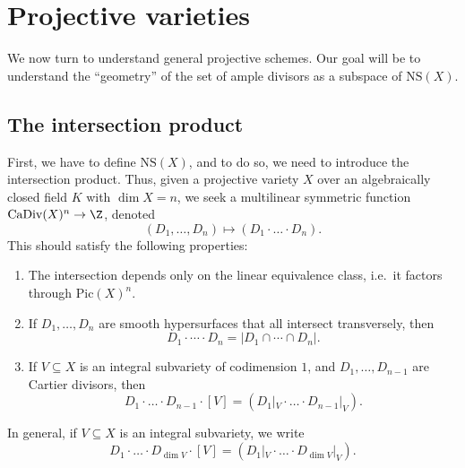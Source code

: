 \documentclass[a4paper]{article}
\newcommand\CaDiv{\mathrm{CaDiv}}
\newcommand\Pic{\mathrm{Pic}}
\newcommand\NS{\mathrm{NS}}
\begin{document}
\section{Projective varieties}
We now turn to understand general projective schemes. Our goal will be to understand the ``geometry'' of the set of ample divisors as a subspace of $\NS(X)$.

\subsection{The intersection product}
First, we have to define $\NS(X)$, and to do so, we need to introduce the intersection product. Thus, given a projective variety $X$ over an algebraically closed field $K$ with $\dim X = n$, we seek a multilinear symmetric function $\CaDiv(X)^n \to \Z$, denoted
\[
  (D_1, \ldots, D_n) \mapsto (D_1 \cdot \ldots \cdot D_n).
\]
This should satisfy the following properties:
\begin{enumerate}
  \item The intersection depends only on the linear equivalence class, i.e.\ it factors through $\Pic(X)^n$.
  \item If $D_1, \ldots, D_n$ are smooth hypersurfaces that all intersect transversely, then
    \[
      D_1 \cdot \cdots \cdot D_n = |D_1 \cap \cdots \cap D_n|.
    \]
  \item If $V \subseteq X$ is an integral subvariety of codimension $1$, and $D_1, \ldots, D_{n - 1}$ are Cartier divisors, then
    \[
      D_1 \cdot \ldots \cdot D_{n - 1} \cdot [V] = (D_1|_V \cdot \ldots \cdot D_{n - 1}|_V).
    \]
\end{enumerate}

In general, if $V \subseteq X$ is an integral subvariety, we write
\[
  D_1 \cdot \ldots \cdot D_{\dim V} \cdot [V] = (D_1|_V \cdot \ldots \cdot D_{\dim V}|_V).
\]
\end{document}
